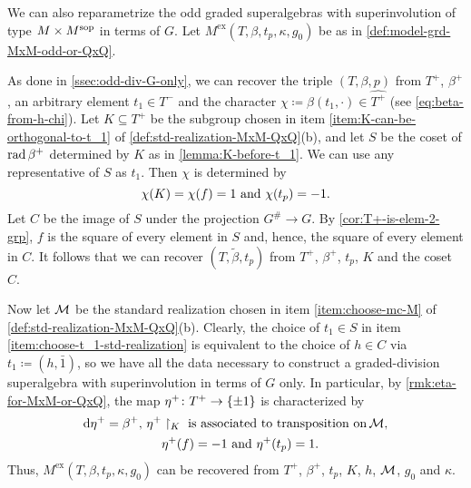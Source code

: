 We can also reparametrize the odd graded superalgebras with superinvolution of type $M\times M^{\mathrm{sop}}$ in terms of $G$. 
Let $M^{\mathrm{ex}}(T, \beta, t_p, \kappa, g_0)$ be as in \cref{def:model-grd-MxM-odd-or-QxQ}. 

As done in \cref{ssec:odd-div-G-only}, we can recover the triple $(T, \beta, p)$ from $T^+$, $\beta^+$, an arbitrary element $t_1 \in T^-$ and the character $\chi \coloneqq \beta(t_1, \cdot) \in \widehat{T^+}$ (see \cref{eq:beta-from-h-chi}). 
Let $K \subseteq T^+$ be the subgroup chosen in item \eqref{item:K-can-be-orthogonal-to-t_1} of \cref{def:std-realization-MxM-QxQ}(b), and let $S$ be the coset of $\operatorname{rad} \beta^+$ determined by $K$ as in \cref{lemma:K-before-t_1}. 
We can use any representative of $S$ as $t_1$. 
Then $\chi$ is determined by
\[\label{eq:equivalent-def-of-chi}
    \chi(K) = \chi(f) = 1 \,\,\text{and}\,\, \chi(t_p) = -1.
\]
Let $C$ be the image of $S$ under the projection $G^\# \to G$. 
By \cref{cor:T+-is-elem-2-grp}, $f$ is the square of every element in $S$ and, hence, the square of every element in $C$.
It follows that we can recover $(T, \tilde\beta, t_p)$ from $T^+$, $\beta^+$, $t_p$, $K$ and the coset $C$. 

Now let $\mathcal M$ be the standard realization chosen in item \eqref{item:choose-mc-M} of \cref{def:std-realization-MxM-QxQ}(b). 
Clearly, the choice of $t_1 \in S$ in item \eqref{item:choose-t_1-std-realization} is equivalent to the choice of $h\in C$ via $t_1 \coloneqq (h, \bar 1)$, so we have all the data necessary to construct a graded-division superalgebra with superinvolution in terms of $G$ only. 
In particular, by \cref{rmk:eta-for-MxM-or-QxQ}, the map $\eta^+\colon T^+ \to \{ \pm 1 \}$ is characterized by
\[\label{eq:eta+-unsharpening-MxM}
    \begin{aligned}
        \mathrm{d}\eta^+ = \beta^+,\, \eta^+&\restriction_{K} \,\, \text{is associated to transposition on}\, \mathcal M,\\ 
        &\eta^+(f) = -1 \,\,\text{and}\,\, \eta^+(t_p) =1. 
    \end{aligned}
\]
Thus, $M^{\mathrm{ex}}(T, \beta, t_p, \kappa, g_0)$ can be recovered from $T^+$, $\beta^+$, $t_p$, $K$, $h$, $\mathcal M$, $g_0$ and $\kappa$. 


